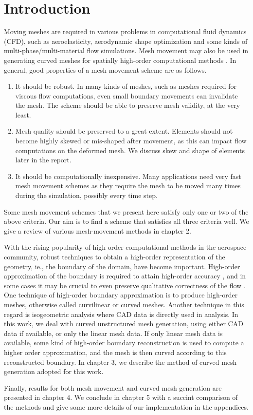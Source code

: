 \chapter{Introduction}

Moving meshes are required in various problems in computational fluid dynamics (CFD), such as aeroelasticity, aerodynamic shape optimization \cite{appl:opt} and some kinds of multi-phase/multi-material flow simulations. Mesh movement may also be used in generating curved meshes for spatially high-order computational methods \cite{curve:persson}. In general, good properties of a mesh movement scheme are as follows.
\begin{enumerate}
\item It should be robust. In many kinds of meshes, such as meshes required for viscous flow computations, even small boundary movements can invalidate the mesh. The scheme should be able to preserve mesh validity, at the very least.
\item Mesh quality should be preserved to a great extent. Elements should not become highly skewed or mis-shaped after movement, as this can impact flow computations on the deformed mesh. We discuss skew and shape of elements later in the report.
\item It should be computationally inexpensive. Many applications need very fast mesh movement schemes as they require the mesh to be moved many times during the simulation, possibly every time step.
\end{enumerate}
Some mesh movement schemes that we present here satisfy only one or two of the above criteria. Our aim is to find a scheme that satisfies all three criteria well. We give a review of various mesh-movement methods in chapter 2.

With the rising popularity of high-order computational methods in the aerospace community, robust techniques to obtain a high-order representation of the geometry, ie., the boundary of the domain, have become important. High-order approximation of the boundary is required to attain high-order accuracy \cite{curve:geomacc}, and in some cases it may be crucial to even preserve qualitative correctness of the flow \cite{appl:dgeuler}. One technique of high-order boundary approximation is to produce high-order meshes, otherwise called curvilinear or curved meshes. Another technique in this regard is isogeometric analysis \cite{isogeometric} where CAD data is directly used in analysis. In this work, we deal with curved unstructured mesh generation, using either CAD data if available, or only the linear mesh data. If only linear mesh data is available, some kind of high-order boundary reconstruction is used to compute a higher order approximation, and the mesh is then curved according to this reconstructed boundary. In chapter 3, we describe the method of curved mesh generation adopted for this work.

Finally, results for both mesh movement and curved mesh generation are presented in chapter 4. We conclude in chapter 5 with a succint comparison of the methods and give some more details of our implementation in the appendices.
